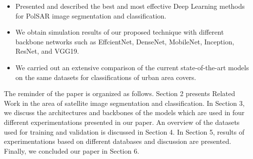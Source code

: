 \documentclass[a4paper,12pt]{spieman}  %
\begin{document}
\begin{spacing}{1}
\begin{itemize}
    \item Presented and described the best and most effective Deep Learning methods for PolSAR image segmentation and classification.
    \item We obtain simulation results of our proposed technique with different backbone networks such as EffcientNet, DenseNet, MobileNet, Inception, ResNet, and VGG19.
    \item We carried out an extensive comparison of the current state-of-the-art models on the
        same datasets for classifications of urban area covers.
\end{itemize}
\par The reminder of the paper is organized as follows. Section 2 presents Related Work in the area of satellite image segmentation and classification. In Section 3, we discuss the architectures and backbones of the models which are used in four different experimentations presented in our paper. An overview of the datasets used for training and validation is discussed in Section 4. In Section 5, results of experimentations based on different databases and discussion are presented. Finally, we concluded our paper in Section 6.

\end{spacing}
\end{document}
